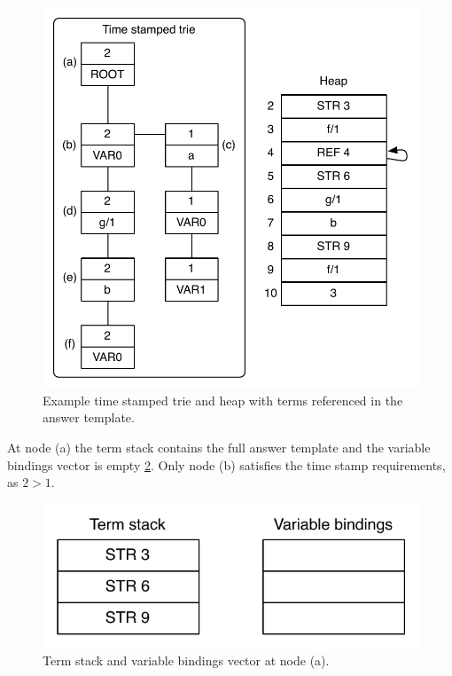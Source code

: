 \begin{figure}[ht]
  \centering
    \includegraphics[scale=0.6]{collect_functor.pdf}
  \caption{Example time stamped trie and heap with terms referenced in the answer template.}
  \label{fig:collect_functor}
\end{figure}

At node (a) the term stack contains the full answer template and the variable bindings vector
is empty \ref{fig:collect_functor1}. Only node (b) satisfies the time stamp requirements,
as $2 > 1$.

\begin{figure}[H]
  \centering
    \includegraphics[scale=0.6]{collect_functor1.pdf}
  \caption{Term stack and variable bindings vector at node (a).}
  \label{fig:collect_functor1}
\end{figure}


